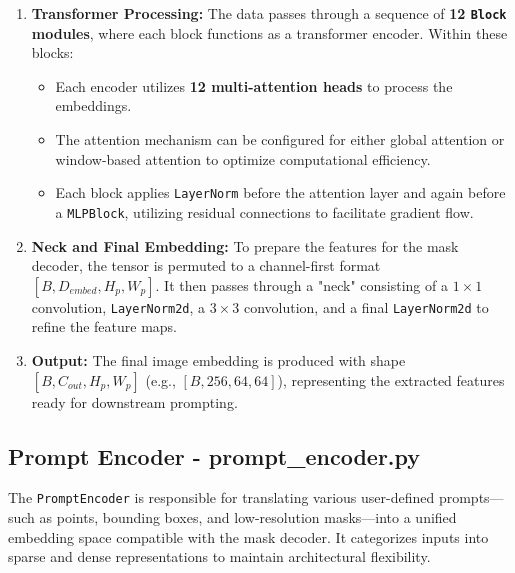 \begin{enumerate}
	This zero-initialization strategy is a standard practice in Vision Transformer architectures, such as ViTDet, to avoid introducing stochastic noise during the initial stages of training. Since the self-attention mechanism is inherently permutation-invariant, it treats patches as an unordered set. By utilizing a learnable parameter starting from zero, the model can adaptively learn optimal spatial encodings tailored specifically for dense segmentation tasks without an initial positional bias. Furthermore, this parameter acts as a placeholder that is typically overwritten by learned values when loading pre-trained checkpoints from large-scale datasets like SA-1B.
	\item \textbf{Transformer Processing:} The data passes through a sequence of \textbf{12 \texttt{Block} modules}, where each block functions as a transformer encoder. Within these blocks:
	\begin{itemize}
		\item Each encoder utilizes \textbf{12 multi-attention heads} to process the embeddings.
		\item The attention mechanism can be configured for either global attention or window-based attention to optimize computational efficiency.
		\item Each block applies \texttt{LayerNorm} before the attention layer and again before a \texttt{MLPBlock}, utilizing residual connections to facilitate gradient flow.
	\end{itemize}
	\item \textbf{Neck and Final Embedding:} To prepare the features for the mask decoder, the tensor is permuted to a channel-first format\\ $[B, D_{embed}, H_{p}, W_{p}]$. It then passes through a "neck" consisting of a $1\times1$ convolution, \texttt{LayerNorm2d}, a $3\times3$ convolution, and a final \texttt{LayerNorm2d} to refine the feature maps.
	\item \textbf{Output:} The final image embedding is produced with shape\\ $[B, C_{out}, H_{p}, W_{p}]$ (e.g., $[B, 256, 64, 64]$), representing the extracted features ready for downstream prompting.
\end{enumerate}

\subsection{Prompt Encoder - prompt\_encoder.py}
The \texttt{PromptEncoder} is responsible for translating various user-defined prompts—such as points, bounding boxes, and low-resolution masks—into a unified embedding space compatible with the mask decoder. It categorizes inputs into sparse and dense representations to maintain architectural flexibility.

